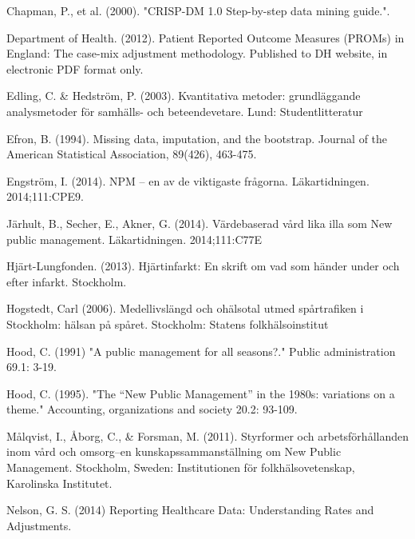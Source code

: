 Chapman, P., et al. (2000). "CRISP-DM 1.0 Step-by-step data mining guide.".\newline

Department of Health. (2012). Patient Reported Outcome Measures (PROMs) in England: The case-mix adjustment methodology. Published to DH website, in electronic PDF format only.\newline

Edling, C. \& Hedström, P. (2003). Kvantitativa metoder: grundläggande analysmetoder för samhälls- och beteendevetare. Lund: Studentlitteratur\newline

Efron, B. (1994). Missing data, imputation, and the bootstrap. Journal of the American Statistical Association, 89(426), 463-475.\newline

Engström, I. (2014). NPM – en av de viktigaste frågorna. Läkartidningen. 2014;111:CPE9.\newline

Järhult, B., Secher, E., Akner, G. (2014). Värdebaserad vård lika illa som New public management. Läkartidningen. 2014;111:C77E\newline

Hjärt-Lungfonden. (2013). Hjärtinfarkt: En skrift om vad som händer under och efter infarkt. Stockholm.\newline

Hogstedt, Carl (2006). Medellivslängd och ohälsotal utmed spårtrafiken i Stockholm: hälsan på spåret. Stockholm: Statens folkhälsoinstitut\newline

Hood, C. (1991) "A public management for all seasons?." Public administration 69.1: 3-19.\newline

Hood, C. (1995). "The “New Public Management” in the 1980s: variations on a theme." Accounting, organizations and society 20.2: 93-109.\newline

Målqvist, I., Åborg, C., \& Forsman, M. (2011). Styrformer och arbetsförhållanden inom vård och omsorg–en kunskapssammanställning om New Public Management. Stockholm, Sweden: Institutionen för folkhälsovetenskap, Karolinska Institutet.\newline

Nelson, G. S. (2014) Reporting Healthcare Data: Understanding Rates and Adjustments.\newline

